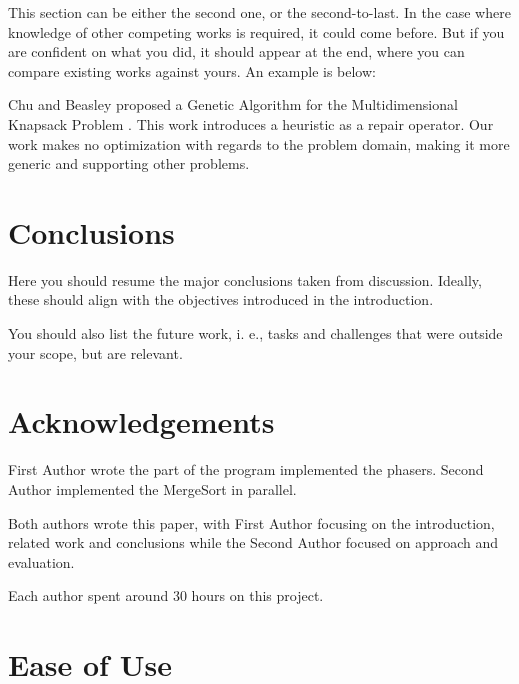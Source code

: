 \documentclass[conference]{IEEEtran}
\begin{document}
This section can be either the second one, or the second-to-last. In the case where knowledge of other competing works is required, it could come before. But if you are confident on what you did, it should appear at the end, where you can compare existing works against yours. An example is below:

Chu and Beasley proposed a Genetic Algorithm for the Multidimensional Knapsack Problem \cite{DBLP:journals/heuristics/ChuB98}. This work introduces a heuristic as a repair operator. Our work makes no optimization with regards to the problem domain, making it more generic and supporting other problems.

\section{Conclusions}

Here you should resume the major conclusions taken from discussion. Ideally, these should align with the objectives introduced in the introduction.


You should also list the future work, i. e., tasks and challenges that were outside your scope, but are relevant.

\section*{Acknowledgements}

First Author wrote the part of the program implemented the phasers. Second Author implemented the MergeSort in parallel. 

Both authors wrote this paper, with First Author focusing on the introduction, related work and conclusions while the Second Author focused on approach and evaluation.

Each author spent around 30 hours on this project.




\section{Ease of Use}
\end{document}
